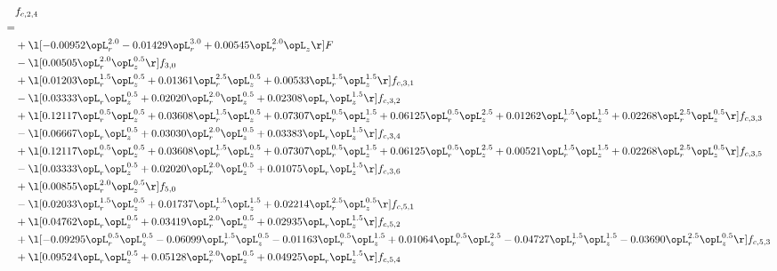 \begin{alignat}{2} 
\label{eq:f_24_2} 
& f_{c,2,4} \nonumber \\ 
 = \\ 
& + \l[  -0.00952 \opL_r^{2.0}   -0.01429 \opL_r^{3.0} +  0.00545 \opL_r^{2.0} \opL_z  \r] F \nonumber \\ 
& - \l[  0.00505 \opL_r^{2.0} \opL_z^{0.5}  \r] f_{3,0} \nonumber \\ 
& + \l[  0.01203 \opL_r^{1.5} \opL_z^{0.5} +  0.01361 \opL_r^{2.5} \opL_z^{0.5} +  0.00533 \opL_r^{1.5} \opL_z^{1.5}  \r] f_{c,3,1} \nonumber \\ 
& - \l[  0.03333 \opL_r \opL_z^{0.5} +  0.02020 \opL_r^{2.0} \opL_z^{0.5} +  0.02308 \opL_r \opL_z^{1.5}  \r] f_{c,3,2} \nonumber \\ 
& + \l[  0.12117 \opL_r^{0.5} \opL_z^{0.5} +  0.03608 \opL_r^{1.5} \opL_z^{0.5} +  0.07307 \opL_r^{0.5} \opL_z^{1.5} +  0.06125 \opL_r^{0.5} \opL_z^{2.5} +  0.01262 \opL_r^{1.5} \opL_z^{1.5} +  0.02268 \opL_r^{2.5} \opL_z^{0.5}  \r] f_{c,3,3} \nonumber \\ 
& - \l[  0.06667 \opL_r \opL_z^{0.5} +  0.03030 \opL_r^{2.0} \opL_z^{0.5} +  0.03383 \opL_r \opL_z^{1.5}  \r] f_{c,3,4} \nonumber \\ 
& + \l[  0.12117 \opL_r^{0.5} \opL_z^{0.5} +  0.03608 \opL_r^{1.5} \opL_z^{0.5} +  0.07307 \opL_r^{0.5} \opL_z^{1.5} +  0.06125 \opL_r^{0.5} \opL_z^{2.5} +  0.00521 \opL_r^{1.5} \opL_z^{1.5} +  0.02268 \opL_r^{2.5} \opL_z^{0.5}  \r] f_{c,3,5} \nonumber \\ 
& - \l[  0.03333 \opL_r \opL_z^{0.5} +  0.02020 \opL_r^{2.0} \opL_z^{0.5} +  0.01075 \opL_r \opL_z^{1.5}  \r] f_{c,3,6} \nonumber \\ 
& + \l[  0.00855 \opL_r^{2.0} \opL_z^{0.5}  \r] f_{5,0} \nonumber \\ 
& - \l[  0.02033 \opL_r^{1.5} \opL_z^{0.5} +  0.01737 \opL_r^{1.5} \opL_z^{1.5} +  0.02214 \opL_r^{2.5} \opL_z^{0.5}  \r] f_{c,5,1} \nonumber \\ 
& + \l[  0.04762 \opL_r \opL_z^{0.5} +  0.03419 \opL_r^{2.0} \opL_z^{0.5} +  0.02935 \opL_r \opL_z^{1.5}  \r] f_{c,5,2} \nonumber \\ 
& + \l[  -0.09295 \opL_r^{0.5} \opL_z^{0.5}   -0.06099 \opL_r^{1.5} \opL_z^{0.5}   -0.01163 \opL_r^{0.5} \opL_z^{1.5} +  0.01064 \opL_r^{0.5} \opL_z^{2.5}   -0.04727 \opL_r^{1.5} \opL_z^{1.5}   -0.03690 \opL_r^{2.5} \opL_z^{0.5}  \r] f_{c,5,3} \nonumber \\ 
& + \l[  0.09524 \opL_r \opL_z^{0.5} +  0.05128 \opL_r^{2.0} \opL_z^{0.5} +  0.04925 \opL_r \opL_z^{1.5}  \r] f_{c,5,4} \nonumber \\ 

\end{alignat}
